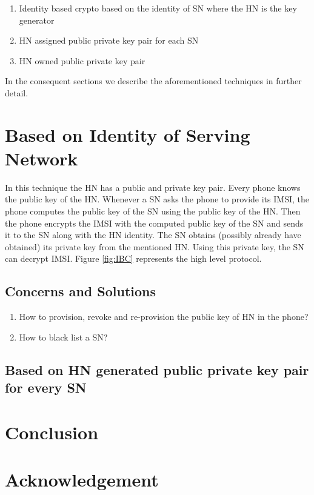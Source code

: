 \documentclass[lnicst,sechang,a4paper]{svmultln}
\begin{document}
\begin{enumerate}
\item Identity based crypto based on the identity of SN where the HN is the key generator
\item HN assigned public private key pair for each SN
\item HN owned public private key pair
\end{enumerate}

In the consequent sections we describe the aforementioned techniques in further detail.

\section{Based on Identity of Serving Network} In this technique the HN has a public and private key pair. Every phone knows the public key of the HN. Whenever a SN asks the phone to provide its IMSI, the phone computes the public key of the SN using the public key of the HN. Then the phone encrypts the IMSI with the computed public key of the SN and sends it to the SN along with the HN identity. The SN obtains (possibly already have obtained) its private key from the mentioned HN. Using this private key, the SN can decrypt IMSI. Figure \ref{fig:IBC} represents the high level protocol.

\subsection{Concerns and Solutions}
\begin{enumerate}
\item How to provision, revoke and re-provision the public key of HN in the phone?
\item How to black list a SN?
\end{enumerate}

\subsection{Based on HN generated public private key pair for every SN}

\section{Conclusion}
\label{sec:conclusion}

\section{Acknowledgement}
\label{sec:acknowledgement}



\begin{thebibliography}{4}


\end{thebibliography}
\end{document}
